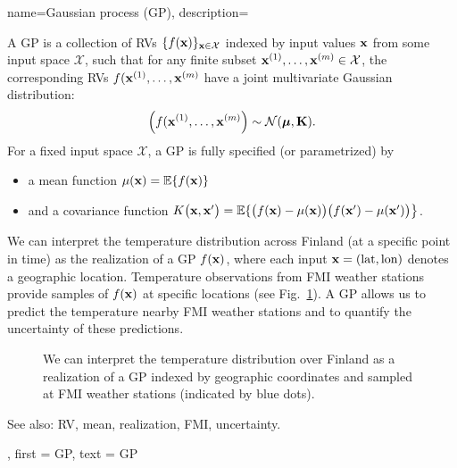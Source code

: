{name={Gaussian process (GP)},
  description={A GP is a collection of RVs 
  	$\{f({\bf x})\}_{{\bf x} \in \mathcal{X}}$ indexed by input values ${\bf x}$ 
  	from some input space $\mathcal{X}$, such that for any finite subset 
  	${\bf x}^{(1)}, \ldots, {\bf x}^{(m)} \in \mathcal{X}$, 
  	the corresponding RVs $f({\bf x}^{(1)}, \ldots, {\bf x}^{(m)}$ have a joint 
  	multivariate Gaussian distribution:
  	\[
  	\left( f({\bf x}^{(1)}, \ldots, {\bf x}^{(m)} \right) \sim \mathcal{N}(\boldsymbol{\mu}, \mathbf{K}).
  	\]
  	For a fixed input space $\mathcal{X}$, a GP is fully specified (or parametrized) by 
  	\begin{itemize}
  		\item a mean function $\mu({\bf x}) = \mathbb{E} \{ f({\bf x})\}$
  		\item and a covariance function $K\big({\bf x},{\bf x}'\big)= \mathbb{E} \{ \big(f({\bf x})-\mu({\bf x})\big) \big(f({\bf x}')-\mu({\bf x}')\big) \big\}$.
  	\end{itemize}
  	 We can interpret the temperature distribution across Finland (at a specific 
  	point in time) as the realization of a GP $f({\bf x})$, where each input ${\bf x} = (\text{lat}, \text{lon})$ 
  	denotes a geographic location. Temperature observations from FMI weather stations provide 
  	samples of $f({\bf x})$ at specific locations (see Fig.\ \ref{fig_gp_FMI}). A GP allows us to 
  	predict the temperature nearby FMI weather stations and to quantify the uncertainty 
  	of these predictions. 
  	\begin{figure}[H]
  	\begin{center}
\vspace*{-15mm}
\end{center}
\caption{We can interpret the temperature distribution over Finland as a realization 
	of a GP indexed by geographic coordinates and sampled at FMI weather stations (indicated by 
	blue dots). \label{fig_gp_FMI}}
\end{figure}
See also: RV, mean, realization, FMI, uncertainty.}, 
first = {GP}, 
text = {GP}
}

